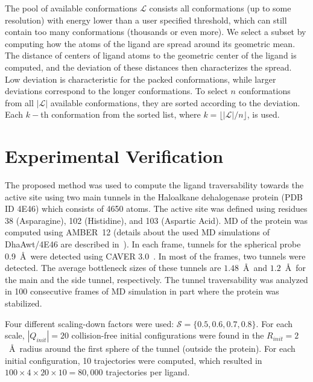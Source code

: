 \documentclass[usletter, 10pt, conference]{ieeeconf} %
\def\QI{Q_{init}}
\def\RI{R_{init}}
\def\L{\mathcal{L}}
\def\S{\mathcal{S}}
\begin{document}
The pool of available conformations $\L$ consists all conformations (up to some resolution) with energy lower than a user specified threshold, which can still contain too many conformations (thousands or even more).
We select a subset by computing how the atoms of the ligand are spread around its geometric mean.
The distance of centers of ligand atoms to the geometric center of the ligand is computed, and the deviation of these
distances then characterizes the spread.
Low deviation is characteristic for the packed conformations, while larger deviations correspond to the longer conformations.
To select $n$ conformations from all $|\L|$ available conformations, they are sorted according to the deviation.
Each $k-$th conformation from the sorted list, where $k=\lfloor{|\L| / n}\rfloor$, is used.






\section{Experimental Verification}


The proposed method was used to compute the ligand traversability towards the active site using two main tunnels in the Haloalkane dehalogenase protein (PDB ID 4E46) which consists of 4650 atoms.
The active site was defined using residues 38 (Asparagine), 102 (Histidine), and 103 (Aspartic Acid).
MD of the protein was computed using AMBER~12 (details about the used MD simulations of DhaAwt/4E46 are described in~\cite{marques2017catalytic}).
In each frame, tunnels for the spherical probe 0.9~\AA\ were detected using CAVER 3.0~\cite{caver3}. 
In most of the frames, two tunnels were detected.
The average bottleneck sizes of these tunnels are $1.48$~\AA\ and $1.2$~\AA\ for the main and the side tunnel, respectively.
The tunnel traversability was analyzed in 100 consecutive frames of MD simulation in part where the protein was stabilized.

Four different scaling-down factors were used: $\S=\{0.5,0.6,0.7,0.8\}$.
For each scale, $|\QI|=20$ collision-free initial configurations were found in the $\RI=2$~\AA\ radius around the first sphere of the tunnel (outside the protein).
For each initial configuration, 10 trajectories were computed, which resulted
in $100 \times 4 \times 20 \times 10 = 80,000$ trajectories per ligand.
\end{document}
